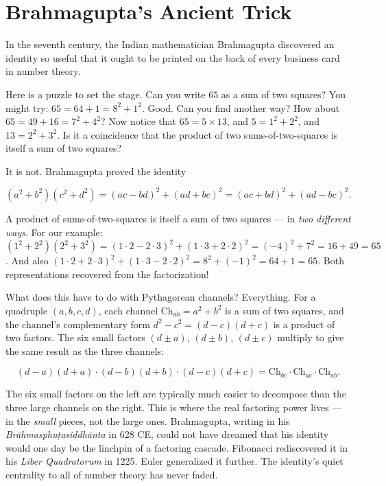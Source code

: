\documentclass[11pt,openright,twoside]{book}
\theoremstyle{definition}
\begin{document}
\bigskip


\section{Brahmagupta's Ancient Trick}

In the seventh century, the Indian mathematician Brahmagupta discovered an identity so useful that it ought to be printed on the back of every business card in number theory.

Here is a puzzle to set the stage. Can you write $65$ as a sum of two squares? You might try: $65 = 64 + 1 = 8^2 + 1^2$. Good. Can you find another way? How about $65 = 49 + 16 = 7^2 + 4^2$? Now notice that $65 = 5 \times 13$, and $5 = 1^2 + 2^2$, and $13 = 2^2 + 3^2$. Is it a coincidence that the product of two sums-of-two-squares is itself a sum of two squares?

It is not. Brahmagupta proved the identity

\[(a^2 + b^2)(c^2 + d^2) = (ac - bd)^2 + (ad + bc)^2 = (ac + bd)^2 + (ad - bc)^2.\]

A product of sums-of-two-squares is itself a sum of two squares --- in \textit{two different ways}. For our example: $(1^2 + 2^2)(2^2 + 3^2) = (1 \cdot 2 - 2 \cdot 3)^2 + (1 \cdot 3 + 2 \cdot 2)^2 = (-4)^2 + 7^2 = 16 + 49 = 65$. And also $(1 \cdot 2 + 2 \cdot 3)^2 + (1 \cdot 3 - 2 \cdot 2)^2 = 8^2 + (-1)^2 = 64 + 1 = 65$. Both representations recovered from the factorization!

What does this have to do with Pythagorean channels? Everything. For a quadruple $(a, b, c, d)$, each channel $\mathrm{Ch}_{ab} = a^2 + b^2$ is a sum of two squares, and the channel's complementary form $d^2 - c^2 = (d-c)(d+c)$ is a product of two factors. The six small factors $(d \pm a)$, $(d \pm b)$, $(d \pm c)$ multiply to give the same result as the three channels:

\[(d-a)(d+a) \cdot (d-b)(d+b) \cdot (d-c)(d+c) = \mathrm{Ch}_{bc} \cdot \mathrm{Ch}_{ac} \cdot \mathrm{Ch}_{ab}.\]

The six small factors on the left are typically much easier to decompose than the three large channels on the right. This is where the real factoring power lives --- in the \textit{small} pieces, not the large ones. Brahmagupta, writing in his \textit{Brāhmasphuṭasiddhānta} in 628 CE, could not have dreamed that his identity would one day be the linchpin of a factoring cascade. Fibonacci rediscovered it in his \textit{Liber Quadratorum} in 1225. Euler generalized it further. The identity's quiet centrality to all of number theory has never faded.
\end{document}
